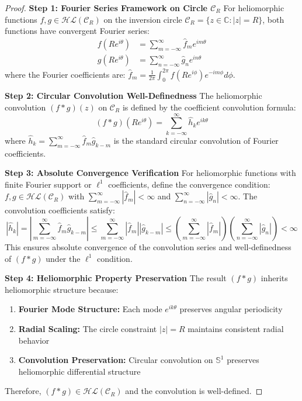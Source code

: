 \begin{proof}
\textbf{Step 1: Fourier Series Framework on Circle $\mathcal{C}_R$}
For heliomorphic functions $f, g \in \mathcal{HL}(\mathcal{C}_R)$ on the inversion circle $\mathcal{C}_R = \{z \in \mathbb{C} : |z| = R\}$, both functions have convergent Fourier series:
\begin{align}
f(Re^{i\theta}) &= \sum_{m=-\infty}^{\infty} \hat{f}_m e^{im\theta}\\
g(Re^{i\theta}) &= \sum_{n=-\infty}^{\infty} \hat{g}_n e^{in\theta}
\end{align}
where the Fourier coefficients are: $\hat{f}_m = \frac{1}{2\pi} \int_0^{2\pi} f(Re^{i\phi}) e^{-im\phi} d\phi$.

\textbf{Step 2: Circular Convolution Well-Definedness}
The heliomorphic convolution $(f * g)(z)$ on $\mathcal{C}_R$ is defined by the coefficient convolution formula:
$$(f * g)(Re^{i\theta}) = \sum_{k=-\infty}^{\infty} \hat{h}_k e^{ik\theta}$$
where $\hat{h}_k = \sum_{m=-\infty}^{\infty} \hat{f}_m \hat{g}_{k-m}$ is the standard circular convolution of Fourier coefficients.

\textbf{Step 3: Absolute Convergence Verification}
For heliomorphic functions with finite Fourier support or $\ell^1$ coefficients, define the convergence condition: $f, g \in \mathcal{HL}(\mathcal{C}_R)$ with $\sum_{m=-\infty}^{\infty} |\hat{f}_m| < \infty$ and $\sum_{n=-\infty}^{\infty} |\hat{g}_n| < \infty$. The convolution coefficients satisfy:
$$|\hat{h}_k| = \left|\sum_{m=-\infty}^{\infty} \hat{f}_m \hat{g}_{k-m}\right| \leq \sum_{m=-\infty}^{\infty} |\hat{f}_m| |\hat{g}_{k-m}| \leq \left(\sum_{m=-\infty}^{\infty} |\hat{f}_m|\right) \left(\sum_{n=-\infty}^{\infty} |\hat{g}_n|\right) < \infty$$
This ensures absolute convergence of the convolution series and well-definedness of $(f * g)$ under the $\ell^1$ condition.

\textbf{Step 4: Heliomorphic Property Preservation}
The result $(f * g)$ inherits heliomorphic structure because:
\begin{enumerate}
    \item \textbf{Fourier Mode Structure:} Each mode $e^{ik\theta}$ preserves angular periodicity
    \item \textbf{Radial Scaling:} The circle constraint $|z| = R$ maintains consistent radial behavior
    \item \textbf{Convolution Preservation:} Circular convolution on $\mathbb{S}^1$ preserves heliomorphic differential structure
\end{enumerate}
Therefore, $(f * g) \in \mathcal{HL}(\mathcal{C}_R)$ and the convolution is well-defined.
\end{proof}

